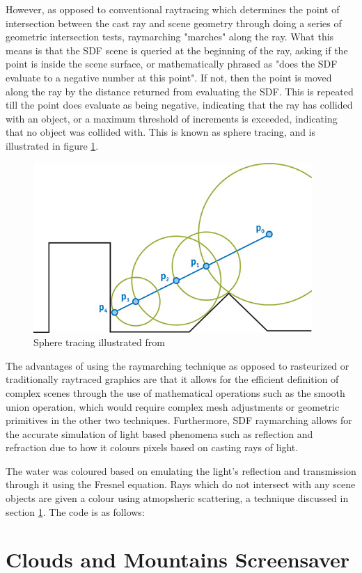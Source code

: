 \documentclass[10pt, openany]{book}
\begin{document}
However, as opposed to conventional raytracing which determines the point of intersection between the cast ray and scene geometry through doing a series of geometric intersection tests, raymarching "marches" along the ray. What this means is that the SDF scene is queried at the beginning of the ray, asking if the point is inside the scene surface, or mathematically phrased as "does the SDF evaluate to a negative number at this point". If not, then the point is moved along the ray by the distance returned from evaluating the SDF. This is repeated till the point does evaluate as being negative, indicating that the ray has collided with an object, or a maximum threshold of increments is exceeded, indicating that no object was collided with. This is known as sphere tracing, and is illustrated in figure \ref{fig:sphere-tracing}.

\begin{figure}[H]
	\centering
	\includegraphics[width=0.35\linewidth]{Spheretracing}
	\caption{Sphere tracing illustrated from \citep{gpugems2}}
	\label{fig:sphere-tracing}
\end{figure}

The advantages of using the raymarching technique as opposed to rasteurized or traditionally raytraced graphics are that it allows for the efficient definition of complex scenes through the use of mathematical operations such as the smooth union operation, which would require complex mesh adjustments or geometric primitives in the other two techniques. Furthermore, SDF raymarching allows for the accurate simulation of light based phenomena such as reflection and refraction due to how it colours pixels based on casting rays of light. 

The water was coloured based on emulating the light's reflection and transmission through it using the Fresnel equation. Rays which do not intersect with any scene objects are given a colour using atmopsheric scattering, a technique discussed in section \ref{sec:clouds}. The code is as follows: 

\section{Clouds and Mountains Screensaver}
\label{sec:clouds}
\end{document}
